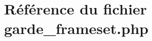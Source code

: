 \hypertarget{garde__frameset_8php}{
\section{R\'{e}f\'{e}rence du fichier garde\_\-frameset.php}
\label{garde__frameset_8php}
}
